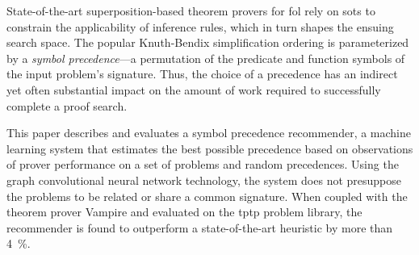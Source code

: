 
State-of-the-art superposition-based theorem provers for \acrlong{fol}
rely on \glspl{sot} to constrain the applicability of inference rules,
which in turn shapes the ensuing search space.
The popular Knuth-Bendix simplification ordering is parameterized by 
a \emph{symbol precedence}---a permutation of the predicate and function symbols
of the input problem's signature.
Thus, the choice of a precedence has an indirect yet often substantial impact
on the amount of work required to successfully complete a proof search.

This paper describes and evaluates a symbol precedence recommender,
a machine learning system that estimates the best possible precedence
based on observations of prover performance on a set of problems and random precedences.
Using the graph convolutional neural network technology,
the system does not presuppose the problems to be related or share a common signature. 
When coupled with the theorem prover Vampire and evaluated on the \acrshort{tptp} problem library,
the recommender is found to outperform a state-of-the-art heuristic by more than \SI{4}{\percent}.




